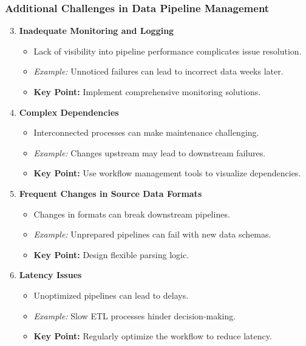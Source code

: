 \documentclass[aspectratio=169]{beamer}
\begin{document}
\begin{frame}[fragile]
    \frametitle{Additional Challenges in Data Pipeline Management}
    \begin{enumerate}
        \setcounter{enumi}{2}
        \item \textbf{Inadequate Monitoring and Logging}
            \begin{itemize}
                \item Lack of visibility into pipeline performance complicates issue resolution.
                \item \textit{Example:} Unnoticed failures can lead to incorrect data weeks later.
                \item \textbf{Key Point:} Implement comprehensive monitoring solutions.
            \end{itemize}
        
        \item \textbf{Complex Dependencies}
            \begin{itemize}
                \item Interconnected processes can make maintenance challenging.
                \item \textit{Example:} Changes upstream may lead to downstream failures.
                \item \textbf{Key Point:} Use workflow management tools to visualize dependencies.
            \end{itemize}
        
        \item \textbf{Frequent Changes in Source Data Formats}
            \begin{itemize}
                \item Changes in formats can break downstream pipelines.
                \item \textit{Example:} Unprepared pipelines can fail with new data schemas.
                \item \textbf{Key Point:} Design flexible parsing logic.
            \end{itemize}
        
        \item \textbf{Latency Issues}
            \begin{itemize}
                \item Unoptimized pipelines can lead to delays.
                \item \textit{Example:} Slow ETL processes hinder decision-making.
                \item \textbf{Key Point:} Regularly optimize the workflow to reduce latency.
            \end{itemize}
        

\end{enumerate}
\end{frame}
\end{document}
